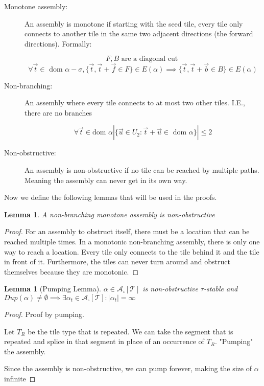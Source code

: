 \documentclass[12pt]{article}
\newtheorem{lemma}[theorem]{Lemma}
\begin{document}
\begin{description}
    \item[Monotone assembly:] An assembly is monotone if starting with the seed tile, every tile only connects to another tile in the same two adjacent directions (the forward directions). Formally:

        $$F,B \text{ are a diagonal cut }$$
        $$\forall \vec{t} \in \text{ dom } \alpha - \sigma, \{\vec{t},\vec{t}+\vec{f} \in F\} \in E(\alpha) \implies \{\vec{t}, \vec{t}+\vec{b} \in B\} \in E(\alpha)$$

    \item[Non-branching:] An assembly where every tile connects to at most two other tiles. I.E., there are no branches

        $$ \forall \vec{t} \in \text{dom } \alpha |\{\vec{u} \in U_2 : \vec{t} + \vec{u} \in \text { dom } \alpha \} | \leq 2 $$

    \item[Non-obstructive:] An assembly is non-obstructive if no tile can be reached by multiple paths. Meaning the assembly can never get in its own way.  


\end{description}


Now we define the following lemmas that will be used in the proofs.

\begin{lemma}
    A non-branching monotone assembly is non-obstructive
\end{lemma}

\begin{proof}
    For an assembly to obstruct itself, there must be a location that can be reached multiple times. In a monotonic non-branching assembly, there is only one way to reach a location. Every tile only connects to the tile behind it and the tile in front of it. Furthermore, the tiles can never turn around and obstruct themselves because they are monotonic.
\end{proof}


\begin{lemma}[Pumping Lemma] 
    $\alpha \in \mathcal{A}_\square[\mathcal{T}]$ is non-obstructive $\tau$-stable and $Dup(\alpha) \ne \emptyset \implies \exists \alpha_t \in \mathcal{A}_\square[\mathcal{T}] : |\alpha_t| = \infty$
\end{lemma}

\begin{proof}
    Proof by pumping. 

    Let $T_R$ be the tile type that is repeated. We can take the segment that is repeated and splice in that segment in place of an occurrence of $T_R$. "Pumping" the assembly. 

    Since the assembly is non-obstructive, we can pump forever, making the size of $\alpha$ infinite 
\end{proof}
\end{document}
